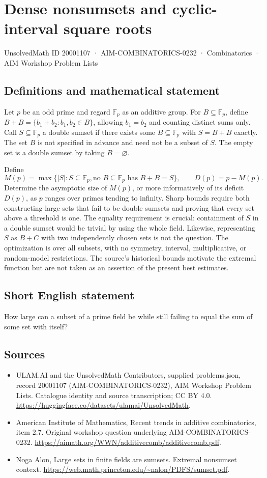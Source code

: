 \documentclass[11pt,a4paper]{article}
\begin{document}
\section*{Dense nonsumsets and cyclic-interval square roots}\label{20001107}
{\small UnsolvedMath ID 20001107 · AIM-COMBINATORICS-0232 · Combinatorics · AIM Workshop Problem Lists}
\subsection{Definitions and mathematical statement}
Let $p$ be an odd prime and regard $\mathbb F_p$ as an additive group.
For $B\subseteq\mathbb F_p$, define
$B+B=\{b_1+b_2:b_1,b_2\in B\}$, allowing $b_1=b_2$ and counting distinct sums only.
Call $S\subseteq\mathbb F_p$ a double sumset if there exists some $B\subseteq\mathbb F_p$ with $S=B+B$ exactly.
The set $B$ is not specified in advance and need not be a subset of $S$.
The empty set is a double sumset by taking $B=\varnothing$.

Define
\[
 M(p)=\max\{|S|:S\subseteq\mathbb F_p,
                   \text{no }B\subseteq\mathbb F_p\text{ has }B+B=S\},
 \qquad D(p)=p-M(p).
\]
Determine the asymptotic size of $M(p)$, or more informatively of its deficit $D(p)$, as $p$ ranges over primes tending to infinity.
Sharp bounds require both constructing large sets that fail to be double sumsets and proving that every set above a threshold is one.
The equality requirement is crucial: containment of $S$ in a double sumset would be trivial by using the whole field.
Likewise, representing $S$ as $B+C$ with two independently chosen sets is not the question.
The optimization is over all subsets, with no symmetry, interval, multiplicative, or random-model restrictions.
The source's historical bounds motivate the extremal function but are not taken as an assertion of the present best estimates.
\subsection{Short English statement}
How large can a subset of a prime field be while still failing to equal the sum of some set with itself?
\subsection{Sources}
\begin{itemize}
\item[S1] ULAM.AI and the UnsolvedMath Contributors, supplied problems.json, record 20001107 (AIM-COMBINATORICS-0232), AIM Workshop Problem Lists. Catalogue identity and source transcription; CC BY 4.0.
\url{https://huggingface.co/datasets/ulamai/UnsolvedMath}.
\item[S2] American Institute of Mathematics, Recent trends in additive combinatorics, item 2.7. Original workshop question underlying AIM-COMBINATORICS-0232.
\url{https://aimath.org/WWN/additivecomb/additivecomb.pdf}.
\item[S3] Noga Alon, Large sets in finite fields are sumsets. Extremal nonsumset context.
\url{https://web.math.princeton.edu/~nalon/PDFS/sumset.pdf}.
\end{itemize}
\end{document}
